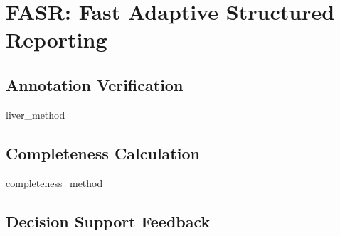 \chapter{FASR: Fast Adaptive Structured Reporting}


\section{Annotation Verification}
{liver_method}

\clearpage
\section{Completeness Calculation}
{completeness_method}

\clearpage
\section{Decision Support Feedback}

